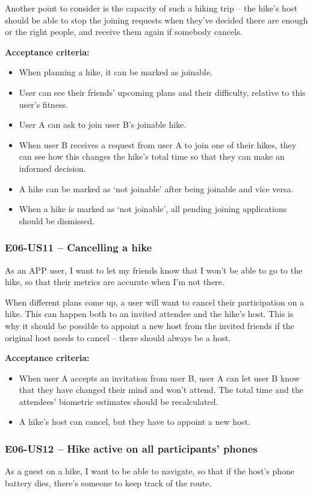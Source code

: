 Another point to consider is the capacity of such a hiking trip -- the hike's host should be able to stop the joining requests when they've decided there are enough or the right people, and receive them again if somebody cancels.

\textbf{Acceptance criteria:}
\begin{itemize}
    \item When planning a hike, it can be marked as joinable.
    \item User can see their friends' upcoming plans and their difficulty, relative to this user's fitness.
    \item User A can ask to join user B's joinable hike.
    \item When user B receives a request from user A to join one of their hikes, they can see how this changes the hike's total time so that they can make an informed decision.
    \item A hike can be marked as `not joinable' after being joinable and vice versa.
    \item When a hike is marked as `not joinable', all pending joining applications should be dismissed.
\end{itemize}

\subsubsection*{E06-US11 -- Cancelling a hike}
As an APP user, I want to let my friends know that I won't be able to go to the hike, so that their metrics are accurate when I'm not there.

When different plans come up, a user will want to cancel their participation on a hike.
This can happen both to an invited attendee and the hike's host.
This is why it should be possible to appoint a new host from the invited friends if the original host needs to cancel -- there should always be a host.

\textbf{Acceptance criteria:}
\begin{itemize}
    \item When user A accepts an invitation from user B, user A can let user B know that they have changed their mind and won't attend. The total time and the attendees' biometric estimates should be recalculated.
    \item A hike's host can cancel, but they have to appoint a new host.
\end{itemize}

\subsubsection*{E06-US12 -- Hike active on all participants' phones}
As a guest on a hike, I want to be able to navigate, so that if the host's phone battery dies, there's someone to keep track of the route.


